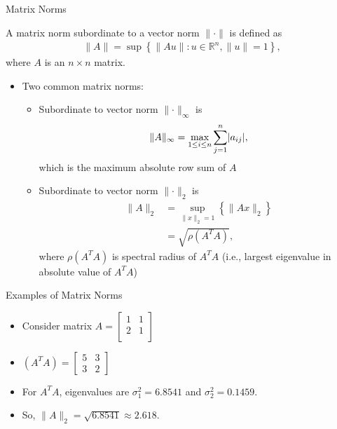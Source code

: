 \documentclass[9pt, serif]{beamer}
\newlength{\wideitemsep}
\let\olditem\item
\renewcommand{\item}{\setlength{\itemsep}{\wideitemsep}\olditem}
\newcommand{\bi}{\begin{itemize}}
\newcommand{\ei}{\end{itemize}}
\newcommand{\abs}[1]{\lvert#1\rvert}
\newcommand{\norm}[1]{\lVert#1\rVert}
\begin{document}
\begin{frame}{Matrix Norms}
    \begin{definition}
        A matrix norm subordinate to a vector norm $\norm{\cdot}$ is defined as
        \begin{align*}
            \norm{A} = \sup\left\{\norm{Au} : u\in\mathbb{R}^n , \norm{u} = 1\right\},
        \end{align*}
        where $A$ is an $n\times n$ matrix.
    \end{definition}
    \pause
    \bi
        \item Two common matrix norms:
        \pause
        \bi
            \item Subordinate to vector norm $\norm{\cdot}_\infty$ is
            \begin{align*}
                \norm{A}_\infty = \smash{\displaystyle\max_{1 \leq i \leq n}} \sum\limits_{j=1}^n \abs{a_{ij}},
            \end{align*}
            which is the maximum absolute row sum of $A$
            \pause

            \item Subordinate to vector norm $\norm{\cdot}_2$ is
            \begin{align*}
                \norm{A}_2 &= \sup\limits_{\norm{x}_2=1} \left\{\norm{Ax}_2\right\}\\
                &= \sqrt{\rho(A^TA)},
            \end{align*}
            where $\rho(A^TA)$ is spectral radius of $A^TA$ (i.e., largest eigenvalue in absolute value of $A^TA$)
        \ei
    \ei
\end{frame}


\begin{frame}{Examples of Matrix Norms}
    \bi
        \item Consider matrix
        $A = \begin{bmatrix}
            1 & 1 \\
            2 & 1\\
        \end{bmatrix}$
        \pause
        \item$(A^TA) = \begin{bmatrix} 5 & 3 \\ 3 & 2 \end{bmatrix}$
        \pause
        \item For $A^TA$, eigenvalues are $\sigma^2_1 = 6.8541$ and $\sigma^2_2 = 0.1459$.
        \pause
        \item So, $\norm{A}_2 = \sqrt{6.8541} \approx 2.618$.
    \ei
\end{frame}
\end{document}
